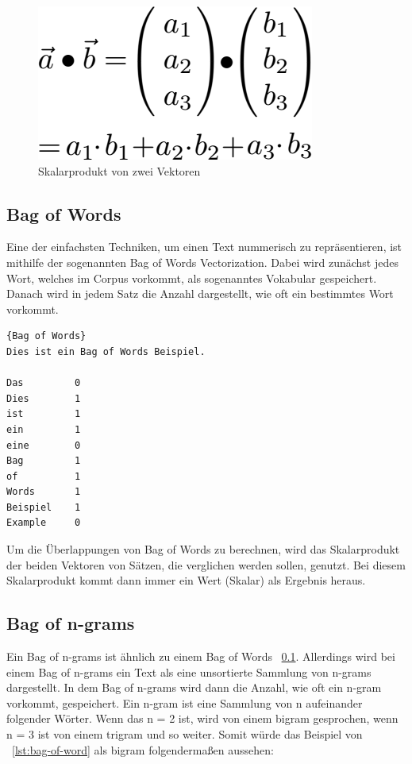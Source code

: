 \begin{figure}[hbt!]
    \centering
    \includegraphics[scale=0.5]{pics/dot-product}
    \caption{Skalarprodukt von zwei Vektoren~\cite{dotProduct}}
    \label{fig:dot-product}
\end{figure}

\subsection{Bag of Words}\label{subsec:bag-of-words}

Eine der einfachsten Techniken, um einen Text nummerisch zu repräsentieren, ist mithilfe der sogenannten Bag of Words Vectorization.
Dabei wird zunächst jedes Wort, welches im Corpus vorkommt, als sogenanntes Vokabular gespeichert.
Danach wird in jedem Satz die Anzahl dargestellt, wie oft ein bestimmtes Wort vorkommt.\cite{textAnalysisMonkeylearn}

\begin{lstlisting}[label={lst:bag-of-word},caption={Bag of Words}]{Bag of Words}
Dies ist ein Bag of Words Beispiel.

Das         0
Dies        1
ist         1
ein         1
eine        0
Bag         1
of          1
Words       1
Beispiel    1
Example     0
\end{lstlisting}

Um die Überlappungen von Bag of Words zu berechnen, wird das Skalarprodukt der beiden Vektoren von Sätzen, die verglichen werden sollen, genutzt.
Bei diesem Skalarprodukt kommt dann immer ein Wert (Skalar) als Ergebnis heraus.


\subsection{Bag of n-grams}

Ein Bag of n-grams ist ähnlich zu einem Bag of Words ~\ref{subsec:bag-of-words}.
Allerdings wird bei einem Bag of n-grams ein Text als eine unsortierte Sammlung von n-grams dargestellt.
In dem Bag of n-grams wird dann die Anzahl, wie oft ein n-gram vorkommt, gespeichert.
Ein n-gram ist eine Sammlung von n aufeinander folgender Wörter.
Wenn das n = 2 ist, wird von einem bigram gesprochen, wenn n = 3 ist von einem trigram und so weiter.
Somit würde das Beispiel von ~\ref{lst:bag-of-word} als bigram folgendermaßen aussehen:

